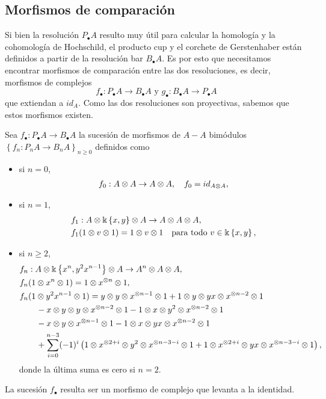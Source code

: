 \documentclass[fleqn,../tesis.tex]{subfiles}
\begin{document}
\subsection{Morfismos de comparación}
Si bien la resolución $P_{\bullet}A$ resulto muy útil para calcular la homología y la cohomología de Hochschild,
el producto cup y el corchete de Gerstenhaber están definidos a partir de la resolución bar $B_{\bullet}A$.
Es por esto que necesitamos encontrar morfismos de comparación entre las dos resoluciones, es decir, morfismos
de complejos
\[
	f_{\bullet} : P_{\bullet}A \to B_{\bullet}A \text{ y } g_{\bullet} : B_{\bullet}A \to P_{\bullet}A
\]
que extiendan a $id_A$. Como las dos resoluciones son proyectivas, sabemos que estos morfismos existen.

\begin{prop}
	Sea $f_{\bullet} : P_{\bullet}A \to B_{\bullet}A$ la sucesión de morfismos de $A-A$ bimódulos
	$\left\lbrace f_{n} : P_{n}A \to B_{n}A \right\rbrace_{n \geq 0}$ definidos como
	\begin{itemize}
		\item si $n = 0$,
		\begin{align*}
			f_0 : A \otimes A \to A \otimes A, \quad f_0 = id_{A\otimes A},
		\end{align*}
		\item si $n = 1$,
		\begin{align*}
			&f_1 : A \otimes \Bbbk \left\lbrace x, y \right\rbrace \otimes A \to A \otimes A \otimes A,\\
			&f_1(1 \otimes v \otimes 1) = 1 \otimes v \otimes 1 \quad\text{para todo } v \in \Bbbk \left\lbrace x, y \right\rbrace,
		\end{align*}
		\item si $n \geq 2 $,
		\begin{align*}
			&f_n : A \otimes \Bbbk \left\lbrace x^{n}, y^2x^{n - 1} \right\rbrace \otimes A \to A^{n} \otimes A \otimes A,\\
			&f_n(1 \otimes x^{n} \otimes 1) = 1 \otimes x^{\otimes n} \otimes 1,\\
			&f_n(1 \otimes y^2x^{n - 1} \otimes 1) = y \otimes y \otimes x^{\otimes n - 1}\otimes 1 + 1 \otimes y \otimes yx \otimes x^{ \otimes n - 2}\otimes 1\\
			&\qquad - x \otimes y \otimes y \otimes x^{\otimes n - 2}\otimes 1 - 1 \otimes x \otimes y^{2}\otimes x^{\otimes n - 2} \otimes 1\\
			&\qquad -x \otimes y \otimes x^{\otimes n - 1} \otimes 1 - 1 \otimes x \otimes yx \otimes x^{\otimes n - 2} \otimes 1\\
			&\qquad + \sum_{i = 0}^{n - 3}(-1)^{i}\left(1\otimes x^{\otimes 2 + i} \otimes y^2 \otimes x^{\otimes n - 3 - i} \otimes 1
				+ 1 \otimes x^{\otimes 2 + i} \otimes yx \otimes x^{\otimes n - 3 - i} \otimes 1\right),
		\end{align*}
		donde la última suma es cero si $n = 2$.
	\end{itemize}
	La sucesión $f_{\bullet}$ resulta ser un morfismo de complejo que levanta a la identidad.
\end{prop}
\end{document}
